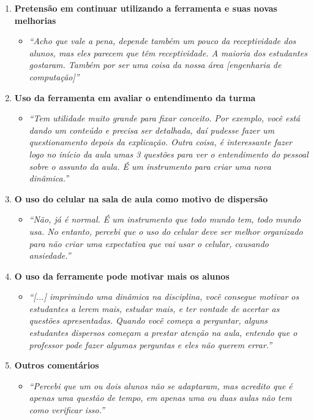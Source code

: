 \begin{enumerate}[leftmargin=*]
  \item \textbf{Pretensão em continuar utilizando a ferramenta e suas novas melhorias}
  \begin{itemize}[label={},leftmargin=*]
    \item \textit{``Acho que vale a pena, depende também um pouco da receptividade dos alunos, mas eles parecem que
    têm receptividade. A maioria dos estudantes gostaram. Também por ser uma coisa da nossa área [engenharia de computação]''}
  \end{itemize}
  \item \textbf{Uso da ferramenta em avaliar o entendimento da turma}
  \begin{itemize}[label={},leftmargin=*]
    \item \textit{``Tem utilidade muito grande para fixar conceito. Por exemplo, você está dando um conteúdo e precisa ser detalhada,
    daí pudesse fazer um questionamento depois da explicação. Outra coisa, é interessante fazer logo no início da aula umas 3 questões
    para ver o entendimento do pessoal sobre o assunto da aula. É um instrumento para criar uma nova dinâmica.''}
  \end{itemize}
  \item \textbf{O uso do celular na sala de aula como motivo de dispersão}
  \begin{itemize}[label={},leftmargin=*]
    \item \textit{``Não, já é normal. É um instrumento que todo mundo tem, todo mundo usa. No entanto, percebi que
    o uso do celular deve ser melhor organizado para não criar uma expectativa que vai usar o celular, causando ansiedade.''}
  \end{itemize}
  \item \textbf{O uso da ferramente pode motivar mais os alunos}
  \begin{itemize}[label={},leftmargin=*]
    \item \textit{``[...] imprimindo uma dinâmica na disciplina, você consegue motivar os estudantes a lerem mais, estudar mais,
    e ter vontade de acertar as questões apresentadas. Quando você começa a perguntar, alguns estudantes dispersos começam a
    prestar atenção na aula, entendo que o professor pode fazer algumas perguntas e eles não querem errar.''}
  \end{itemize}
  \item \textbf{Outros comentários}
  \begin{itemize}[label={},leftmargin=*]
    \item \textit{``Percebi que um ou dois alunos não se adaptaram, mas acredito que é apenas uma questão de tempo, em
    apenas uma ou duas aulas não tem como verificar isso.''}
  \end{itemize}
\end{enumerate}

